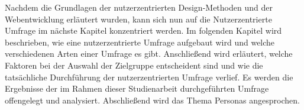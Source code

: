 Nachdem die Grundlagen der nutzerzentrierten Design-Methoden und der Webentwicklung erläutert wurden, kann sich nun auf die Nutzerzentrierte Umfrage im nächste Kapitel konzentriert werden.
Im folgenden Kapitel wird beschrieben, wie eine nutzerzentrierte Umfrage aufgebaut wird und welche verschiedenen Arten einer Umfrage es gibt.
Anschließend wird erläutert, welche Faktoren bei der Auswahl der Zielgruppe entscheident sind und wie die tatsächliche Durchführung der nutzerzentrierten Umfrage verlief.
Es werden die Ergebnisse der im Rahmen dieser Studienarbeit durchgeführten Umfrage offengelegt und analysiert.
Abschließend wird das Thema Personas angesprochen.
